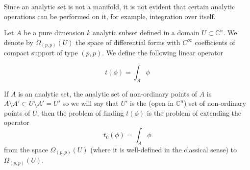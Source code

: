 \documentclass[12pt,twoside,a4paper]{report}
\begin{document}
Since an analytic set is not a manifold, it is not evident that certain analytic operations can be performed on it, for example, integration over itself.

Let $A$ be a pure dimension $k$ analytic subset defined in a domain $U\subset\mathbb{C}^n$. We denote by $\Omega_{(p,p)}(U)$ the space of differential forms with $C^{\infty}$ coefficients of compact support of type $(p,p)$. We define the following linear operator

\[
    t(\phi)=\int_{A}\phi
\]

If $A$ is an analytic set, the analytic set of non-ordinary points of $A$ is $A\setminus A'\subset U\setminus A'=U'$ so we will say that $U'$ is the (open in $\mathbb{C}^n$) set of non-ordinary points of $U$, then the problem of finding $t(\phi)$ is the problem of extending the operator
\[
    t_0(\phi)=\int_{A}\phi
\]
from the space $\Omega_{(p,p)}(U)$ (where it is well-defined in the classical sense) to $\Omega_{(p,p)}(U)$.
\end{document}
